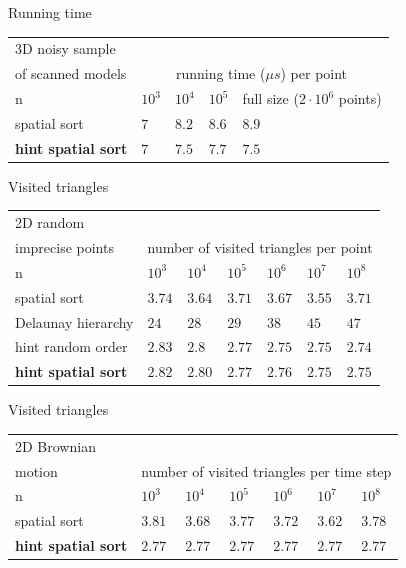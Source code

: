 \documentclass{beamer}
\begin{document}
\begin{frame}{Running time}
\begin{tabular}{|l||l|l|l|l|}
\hline
3D noisy sample \\
of scanned models& \multicolumn{4}{|c|}{running time  ($\mu s$) per point}\\
 \hline \hline
    n & $10^3$ & $10^4$ & $10^5$ & full size ($2 \cdot 10^6$ points)\\\hline
    spatial sort & $7$ & $8.2$ & $8.6$ & $8.9$\\\hline
    \textbf{hint spatial sort} & $7$ & $7.5$ & $7.7$ & $7.5$\\\hline
\end{tabular}
\end{frame}

\begin{frame}{Visited triangles}
\begin{tabular}{|l||l|l|l|l|l|l|}
\hline
2D random \\
imprecise points & \multicolumn{6}{|c|}{number of visited triangles per point}\\
 \hline \hline
    n & $10^3$ & $10^4$ & $10^5$ & $10^6$ & $10^7$ & $10^8$\\\hline
    spatial sort & $3.74$ & $3.64 $ & $3.71 $ & $3.67 $ & $3.55 $ & $3.71$\\\hline
    Delaunay hierarchy & $24$ & $28$ & $29$ & $38$ & $45$ & $47$\\\hline
    hint random order & $2.83 $ & $2.8 $ & $2.77 $ & $2.75 $ & $2.75$ & $2.74$\\\hline
    \textbf{hint spatial sort} & $2.82$ & $2.80$ & $2.77$ & $2.76$ & $2.75$ & $2.75$\\\hline
\end{tabular}
\end{frame}

\begin{frame}{Visited triangles}
\begin{tabular}{|l||l|l|l|l|l|l|}
\hline
2D Brownian \\
motion & \multicolumn{6}{|c|}{number of visited triangles per time step}\\
 \hline \hline
    n & $10^3$ & $10^4$ & $10^5$ & $10^6$ & $10^7$ & $10^8$\\\hline
    spatial sort & $3.81$ & $3.68 $ & $3.77 $ & $3.72 $ & $3.62 $ & $3.78$\\\hline
    \textbf{hint spatial sort} & $2.77$ & $2.77$ & $2.77$ & $2.77$ & $2.77$ & $2.77$\\\hline
\end{tabular}
\end{frame}
\end{document}
